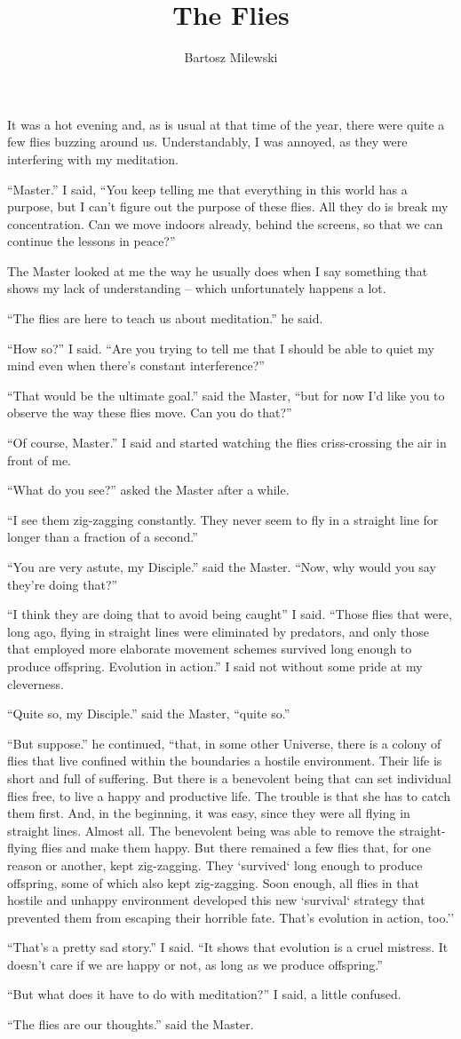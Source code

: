 \documentclass{memoir}
\author{Bartosz Milewski}
\title{The Flies}
\date{}
\begin{document}
\maketitle{}
It was a hot evening and, as is usual at that time of the year, there were quite a few flies buzzing around us. Understandably, I was annoyed, as they were interfering with my meditation. 

``Master.'' I said, ``You keep telling me that everything in this world has a purpose, but I can't figure out the purpose of these flies. All they do is break my concentration. Can we move indoors already, behind the screens, so that we can continue the lessons in peace?'' 

The Master looked at me the way he usually does when I say something that shows my lack of understanding -- which unfortunately happens a lot. 

``The flies are here to teach us about meditation.'' he said.

``How so?'' I said. ``Are you trying to tell me that I should be able to quiet my mind even when there's constant interference?''

``That would be the ultimate goal.'' said the Master, ``but for now I'd like you to observe the way these flies move. Can you do that?''

``Of course, Master.'' I said and started watching the flies criss-crossing the air in front of me.

``What do you see?'' asked the Master after a while.

``I see them zig-zagging constantly. They never seem to fly in a straight line for longer than a fraction of a second.''

``You are very astute, my Disciple.'' said the Master. ``Now, why would you say they're doing that?''

``I think they are doing that to avoid being caught'' I said. ``Those flies that were, long ago, flying in straight lines were eliminated by predators, and only those that employed more elaborate movement schemes survived long enough to produce offspring. Evolution in action.'' I said not without some pride at my cleverness.

``Quite so, my Disciple.'' said the Master, ``quite so.''

``But suppose.'' he continued, ``that, in some other Universe, there is a colony of flies that live confined within the boundaries a hostile environment. Their life is short and full of suffering. But there is a benevolent being that can set individual flies free, to live a happy and productive life. The trouble is that she has to catch them first. And, in the beginning, it was easy, since they were all flying in straight lines. Almost all. The benevolent being was able to remove the straight-flying flies and make them happy. But there remained a few flies that, for one reason or another, kept zig-zagging. They `survived` long enough to produce offspring, some of which also kept zig-zagging. Soon enough, all flies in that hostile and unhappy environment developed this new `survival` strategy that prevented them from escaping their horrible fate. That's evolution in action, too.''

``That's a pretty sad story.'' I said. ``It shows that evolution is a cruel mistress. It doesn't care if we are happy or not, as long as we produce offspring.''

``But what does it have to do with meditation?'' I said, a little confused.

``The flies are our thoughts.'' said the Master.
\end{document}
